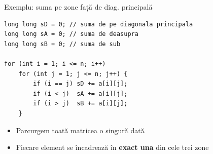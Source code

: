 \documentclass{beamer}
\begin{document}
\begin{frame}[fragile]{Exemplu: suma pe zone față de diag. principală}
  \begin{lstlisting}
long long sD = 0; // suma de pe diagonala principala
long long sA = 0; // suma de deasupra
long long sB = 0; // suma de sub

for (int i = 1; i <= n; i++)
    for (int j = 1; j <= n; j++) {
        if (i == j) sD += a[i][j];
        if (i < j)  sA += a[i][j];
        if (i > j)  sB += a[i][j];
    }
  \end{lstlisting}

  \begin{itemize}
    \item Parcurgem toată matricea o singură dată
    \item Fiecare element se încadrează în \textbf{exact una} din cele trei zone
  \end{itemize}
\end{frame}

\end{document}
